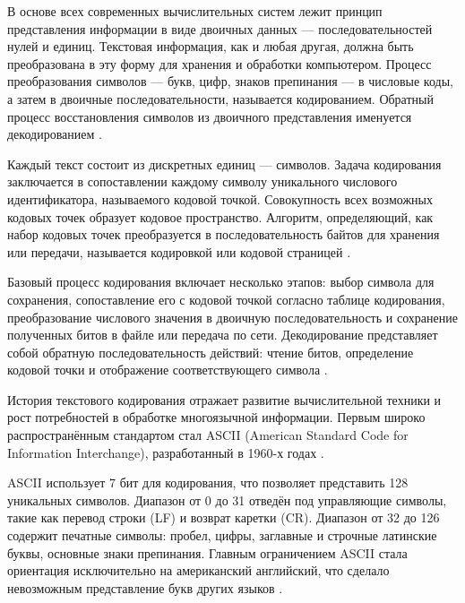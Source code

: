 \documentclass{SibFU-docs}
\begin{document}

В основе всех современных вычислительных систем лежит принцип представления информации в виде двоичных данных — последовательностей нулей и единиц. Текстовая информация, как и любая другая, должна быть преобразована в эту форму для хранения и обработки компьютером. Процесс преобразования символов — букв, цифр, знаков препинания — в числовые коды, а затем в двоичные последовательности, называется кодированием. Обратный процесс восстановления символов из двоичного представления именуется декодированием \cite{unicode2024, petzold2001}.

Каждый текст состоит из дискретных единиц — символов. Задача кодирования заключается в сопоставлении каждому символу уникального числового идентификатора, называемого кодовой точкой. Совокупность всех возможных кодовых точек образует кодовое пространство. Алгоритм, определяющий, как набор кодовых точек преобразуется в последовательность байтов для хранения или передачи, называется кодировкой или кодовой страницей \cite{knut2020, tanenbaum2015}.

Базовый процесс кодирования включает несколько этапов: выбор символа для сохранения, сопоставление его с кодовой точкой согласно таблице кодирования, преобразование числового значения в двоичную последовательность и сохранение полученных битов в файле или передача по сети. Декодирование представляет собой обратную последовательность действий: чтение битов, определение кодовой точки и отображение соответствующего символа \cite{rfc3629, w3c2024}.


История текстового кодирования отражает развитие вычислительной техники и рост потребностей в обработке многоязычной информации. Первым широко распространённым стандартом стал ASCII (American Standard Code for Information Interchange), разработанный в 1960-х годах \cite{unicode1996}.

ASCII использует 7 бит для кодирования, что позволяет представить 128 уникальных символов. Диапазон от 0 до 31 отведён под управляющие символы, такие как перевод строки (LF) и возврат каретки (CR). Диапазон от 32 до 126 содержит печатные символы: пробел, цифры, заглавные и строчные латинские буквы, основные знаки препинания. Главным ограничением ASCII стала ориентация исключительно на американский английский, что сделало невозможным представление букв других языков \cite{tannenbaum2019}.
\end{document}
